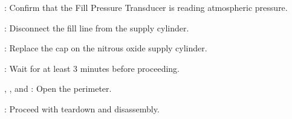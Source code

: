 \begin{checklist}
    \item \daq{}: Confirm that the Fill Pressure Transducer is reading atmospheric pressure.
    \item \primary{}: Disconnect the fill line from the supply cylinder.
    \item \primary{}: Replace the cap on the nitrous oxide supply cylinder.
    \item \ops{}: Wait for at least 3 minutes before proceeding.
    \item \peri{}, \perii{}, and \periii{}: Open the perimeter.
    \item \ops{}: Proceed with teardown and disassembly.


\end{checklist}


